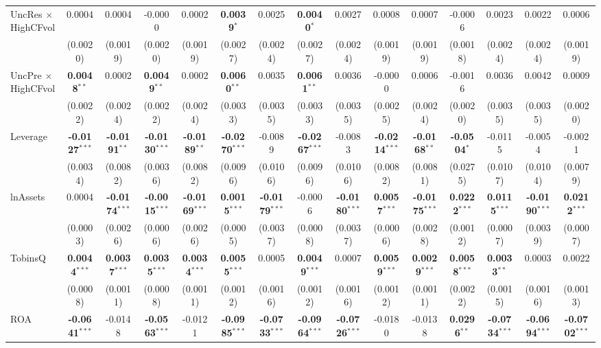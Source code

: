 \begin{landscape}
\begin{table}[H]
\begin{tabular}{lcccccccccccccc}
UncRes $\times$ HighCFvol & 0.0004 & 0.0004 & -0.0000 & 0.0002 & \textbf{0.0039}$^{*}$ & 0.0025 & \textbf{0.0040}$^{*}$ & 0.0027 & 0.0008 & 0.0007 & -0.0006 & 0.0023 & 0.0022 & 0.0006 \\
 & (0.0020) & (0.0019) & (0.0020) & (0.0019) & (0.0027) & (0.0024) & (0.0027) & (0.0024) & (0.0019) & (0.0019) & (0.0018) & (0.0024) & (0.0024) & (0.0019) \\
UncPre $\times$ HighCFvol & \textbf{0.0048}$^{**}$ & 0.0002 & \textbf{0.0049}$^{**}$ & 0.0002 & \textbf{0.0060}$^{**}$ & 0.0035 & \textbf{0.0061}$^{**}$ & 0.0036 & -0.0000 & 0.0006 & -0.0016 & 0.0036 & 0.0042 & 0.0009 \\
 & (0.0022) & (0.0024) & (0.0022) & (0.0024) & (0.0033) & (0.0035) & (0.0033) & (0.0035) & (0.0025) & (0.0024) & (0.0020) & (0.0035) & (0.0035) & (0.0020) \\
\midrule
Leverage & \textbf{-0.0127}$^{***}$ & \textbf{-0.0191}$^{**}$ & \textbf{-0.0130}$^{***}$ & \textbf{-0.0189}$^{**}$ & \textbf{-0.0270}$^{***}$ & -0.0089 & \textbf{-0.0267}$^{***}$ & -0.0083 & \textbf{-0.0214}$^{***}$ & \textbf{-0.0168}$^{**}$ & \textbf{-0.0504}$^{*}$ & -0.0115 & -0.0054 & -0.0021 \\
 & (0.0034) & (0.0082) & (0.0036) & (0.0082) & (0.0096) & (0.0106) & (0.0096) & (0.0106) & (0.0082) & (0.0081) & (0.0275) & (0.0107) & (0.0104) & (0.0079) \\
lnAssets & 0.0004 & \textbf{-0.0174}$^{***}$ & \textbf{-0.0015}$^{***}$ & \textbf{-0.0169}$^{***}$ & \textbf{0.0015}$^{***}$ & \textbf{-0.0179}$^{***}$ & -0.0006 & \textbf{-0.0180}$^{***}$ & \textbf{0.0057}$^{***}$ & \textbf{-0.0175}$^{***}$ & \textbf{0.0222}$^{***}$ & \textbf{0.0115}$^{***}$ & \textbf{-0.0190}$^{***}$ & \textbf{0.0212}$^{***}$ \\
 & (0.0003) & (0.0026) & (0.0006) & (0.0026) & (0.0005) & (0.0037) & (0.0008) & (0.0037) & (0.0006) & (0.0028) & (0.0012) & (0.0007) & (0.0039) & (0.0007) \\
TobinsQ & \textbf{0.0044}$^{***}$ & \textbf{0.0037}$^{***}$ & \textbf{0.0035}$^{***}$ & \textbf{0.0034}$^{***}$ & \textbf{0.0055}$^{***}$ & 0.0005 & \textbf{0.0049}$^{***}$ & 0.0007 & \textbf{0.0059}$^{***}$ & \textbf{0.0029}$^{***}$ & \textbf{0.0058}$^{***}$ & \textbf{0.0033}$^{**}$ & 0.0003 & 0.0022 \\
 & (0.0008) & (0.0011) & (0.0008) & (0.0011) & (0.0012) & (0.0016) & (0.0012) & (0.0016) & (0.0012) & (0.0011) & (0.0022) & (0.0015) & (0.0016) & (0.0013) \\
ROA & \textbf{-0.0641}$^{***}$ & -0.0148 & \textbf{-0.0563}$^{***}$ & -0.0121 & \textbf{-0.0985}$^{***}$ & \textbf{-0.0733}$^{***}$ & \textbf{-0.0964}$^{***}$ & \textbf{-0.0726}$^{***}$ & -0.0180 & -0.0138 & \textbf{0.0296}$^{**}$ & \textbf{-0.0734}$^{***}$ & \textbf{-0.0694}$^{***}$ & \textbf{-0.0702}$^{***}$ \\

\end{tabular}
\end{table}
\end{landscape}

